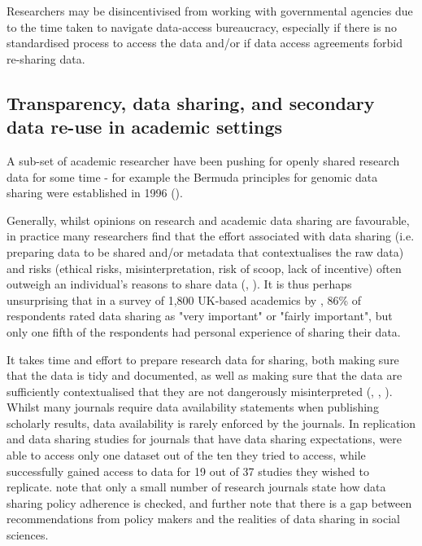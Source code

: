 \documentclass{CUP-JNL-DAP}%
\begin{document}
Researchers may be disincentivised from working with governmental agencies due to the time taken to navigate data-access bureaucracy, especially if there is no standardised process to access the data and/or if data access agreements forbid re-sharing data.  

\subsection{Transparency, data sharing, and secondary data re-use in academic settings}
A sub-set of academic researcher have been pushing for openly shared research data for some time - for example the Bermuda principles for genomic data sharing were established in 1996 (\cite{maxson_jones_bermuda_2018}).

Generally, whilst opinions on research and academic data sharing are favourable, in practice many researchers find that the effort associated with data sharing (i.e. preparing data to be shared and/or metadata that contextualises the raw data) and risks (ethical risks, misinterpretation, risk of scoop, lack of incentive) often outweigh an individual’s reasons to share data (\cite{Yimei_Zhu_Open_access_in_uk}, \cite{datasharing_sociology}). It is thus perhaps unsurprising that in a survey of 1,800 UK-based academics by \cite{Yimei_Zhu_Open_access_in_uk}, 86\% of respondents rated data sharing as "very important" or "fairly important", but only one fifth of the respondents had personal experience of sharing their data. 

 It takes time and effort to prepare research data for sharing, both making sure that the data is tidy and documented, as well as making sure that the data are sufficiently contextualised that they are not dangerously misinterpreted (\cite{datasharing_rcts}, \cite{Yimei_Zhu_Open_access_in_uk}, \cite{empirical_datasharing_plos}). Whilst many journals require data availability statements when publishing scholarly results, data availability is rarely enforced by the journals. In replication and data sharing studies for journals that have data sharing expectations, \cite{empirical_datasharing_plos} were able to access only one dataset out of the ten they tried to access, while \cite{datasharing_rcts} successfully gained access to data for 19 out of 37 studies they wished to replicate. \cite{datasharing_sociology} note that only a small number of research journals state how data sharing policy adherence is checked, and further note that there is a gap between recommendations from policy makers and the realities of data sharing in social sciences. 
 
\end{document}

